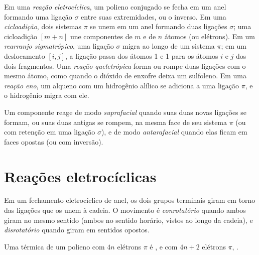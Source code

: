 \begin{definition}\label{def:b3:pericyclic:families}
Em uma \emph{reação eletrocíclica}, um polieno
conjugado se fecha em um anel formando uma ligação $\sigma$ entre suas extremidades, ou o
inverso. Em uma \emph{cicloadição}, dois sistemas $\pi$ se unem
em um anel formando duas ligações $\sigma$; uma cicloadição $[m + n]$ une componentes
de $m$ e de $n$ átomos (ou elétrons). Em um \emph{rearranjo
sigmatrópico}, uma ligação $\sigma$ migra ao longo de um sistema $\pi$;
em um deslocamento $[i, j]$, a ligação passa dos átomos 1 e 1 para os átomos $i$ e $j$
dos dois fragmentos. Uma \emph{reação queletrópica}
forma ou rompe duas ligações com o mesmo átomo, como quando o dióxido de enxofre
deixa um sulfoleno. Em uma \emph{reação eno}, um alqueno
com um hidrogênio alílico se adiciona a uma ligação $\pi$, e o hidrogênio migra com ele.
\end{definition}

\begin{definition}\label{def:b3:pericyclic:faciality}
Um componente reage de modo \emph{suprafacial} quando suas duas novas
ligações se formam, ou suas duas antigas se rompem, na mesma face de seu sistema $\pi$ (ou com
retenção em uma ligação $\sigma$), e de modo \emph{antarafacial} quando elas
ficam em faces opostas (ou com inversão).
\end{definition}

\section{Reações eletrocíclicas}

\begin{definition}\label{def:b3:pericyclic:rotation-modes}
Em um fechamento eletrocíclico de anel, os dois grupos terminais giram em torno das ligações
que os unem à cadeia. O movimento é \emph{conrotatório}
quando ambos giram no mesmo sentido (ambos no sentido horário, vistos ao longo da cadeia), e
\emph{disrotatório} quando giram em sentidos opostos.
\end{definition}

\begin{theorem}\label{thm:b3:pericyclic:electrocyclic}
Uma  térmica de um polieno com $4n$ elétrons $\pi$ é
, e com $4n + 2$ elétrons $\pi$, .
\end{theorem}


